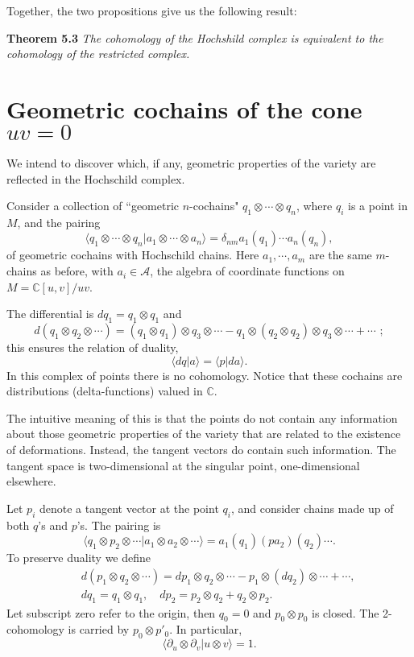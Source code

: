 \documentclass[a4paper,a4paper]{article}
\begin{document}
Together, the two propositions give us the following result:
\smallskip

\noindent\textbf{Theorem 5.3} \textit{
The cohomology of the Hochshild complex is  equivalent to the cohomology 
of the restricted complex.}

 
\section{Geometric cochains of the cone $uv = 0$}  %

We intend to discover which, if any, geometric properties of the variety
are reflected in the Hochschild complex.

\bigskip
{} Consider a collection of ``geometric $n$-cochains"
$q_1 \otimes \cdots \otimes q_n$, where $q_i$ is a point in $M$, and
the pairing
$$
\langle q_1\otimes \cdots \otimes q_n|a_1\otimes\cdots \otimes
a_n\rangle = \delta_{nm}a_1(q_1)\cdots a_n(q_n),
$$
of geometric cochains with Hochschild chains.  
Here  $a_1,\cdots, a_m$ are the same $m$-chains as before, with
$a_i \in {\mathcal{A}}$, the algebra of coordinate functions on 
$M = \mathbb{C}[u,v]/uv$. 

The  differential is $dq_1 = q_1\otimes q_1$ and
$$
d(q_1\otimes q_2\otimes \cdots) = (q_1\otimes q_1) \otimes q_3\otimes 
\cdots - q_1\otimes (q_2\otimes q_2) \otimes q_3\otimes \cdots + \cdots \,\,;
$$
this ensures the relation of duality,
$$
\langle dq|a\rangle = \langle p|da\rangle.
$$
In this complex of points there is no cohomology. Notice that these
cochains are distributions (delta-functions) valued in $\mathbb{C}$.

The intuitive meaning of this is that the points do not contain any
information about those geometric properties of the  variety that
are related to the existence of deformations. Instead, the tangent vectors
do contain such information. The tangent space is two-dimensional at the
singular point, one-dimensional elsewhere.

\bigskip

 Let $p_i $ denote  a
tangent vector  at the point  $ q_i$, and consider chains
made up of both $q$'s and $p$'s. The pairing is
$$
\langle q_1\otimes p_2\otimes \cdots|a_1\otimes a_2\otimes
\cdots\rangle = a_1(q_1)(p a_2)(q_2)\cdots.
$$
To preserve duality we define
\begin{eqnarray*}
&&d(p_1\otimes q_2\otimes \cdots) = dp_1\otimes q_2\otimes \cdots -
p_1 \otimes (dq_2)\otimes \cdots + \cdots,\\
&&dq_1 = q_1 \otimes q_1,\quad dp_2 = p_2\otimes q_2 + q_2\otimes
p_2.
\end{eqnarray*}
Let subscript zero refer to the origin, then $q_0 = 0$ and  $p_0\otimes
p_0$ is closed. The 2-cohomology is carried by $p_0\otimes p'_0$.
In particular,
$$
\langle \partial_u\otimes \partial_v|u\otimes v\rangle= 1.
$$
\end{document}
